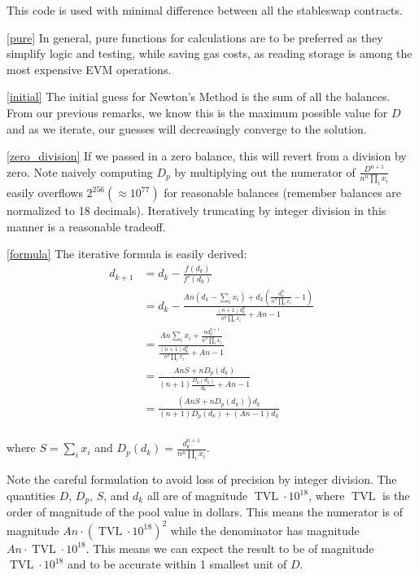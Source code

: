 \documentclass[
]{article}
\begin{document}
This code is used with minimal difference between all the stableswap
contracts.

\ref{pure} In general, pure functions for calculations are to be
preferred as they simplify logic and testing, while saving gas costs, as
reading storage is among the most expensive EVM operations.

\ref{initial} The initial guess for Newton's Method is the sum of all
the balances. From our previous remarks, we know this is the maximum
possible value for \(D\) and as we iterate, our guesses will
decreasingly converge to the solution.

\ref{zero_division} If we passed in a zero balance, this will revert
from a division by zero. Note naively computing \(D_p\) by multiplying
out the numerator of \(\frac{D^{n+1}}{n^n \prod_i x_i}\) easily
overflows \(2^{256} (\approx 10^{77})\) for reasonable balances
(remember balances are normalized to 18 decimals). Iteratively
truncating by integer division in this manner is a reasonable tradeoff.

\ref{formula} The iterative formula is easily derived: \[\begin{aligned}
d_{k+1} &= d_k - \frac{f(d_k)}{f'(d_k)} \\
&= d_k - \frac{A n (d_k - \sum_i x_i)  + d_k(\frac{d_k^{n}}{n^n \prod_i x_i} - 1)}{\frac{(n+1)d_k^n}{n^n \prod_i x_i} + An - 1} \\
&= \frac{An\sum_i x_i + \frac{nd_k^{n+1}}{n^n \prod_i x_i}}{\frac{(n+1)d_k^n}{n^n\prod_i x_i} + An - 1} \\
&= \frac{AnS + nD_p(d_k)}{(n+1)\frac{D_p(d_k)}{d_k} + An - 1} \\
&= \frac{(AnS + nD_p(d_k))d_k}{(n+1)D_p(d_k) + (An-1)d_k}\\
\end{aligned}\]

where \(S = \sum_i x_i\) and
\(D_p(d_k) = \frac{d_k^{n+1}}{n^n \prod_i x_i}\).

Note the careful formulation to avoid loss of precision by integer
division. The quantities \(D\), \(D_p\), \(S\), and \(d_k\) all are of
magnitude \(\operatorname{TVL} \cdot 10^{18}\), where
\(\operatorname{TVL}\) is the order of magnitude of the pool value in
dollars. This means the numerator is of magnitude
\(An\cdot (\operatorname{TVL}\cdot 10^{18})^2\) while the denominator
has magnitude \(An\cdot \operatorname{TVL}\cdot 10^{18}\). This means we
can expect the result to be of magnitude
\(\operatorname{TVL}\cdot 10^{18}\) and to be accurate within 1 smallest
unit of \(D\).
\end{document}
